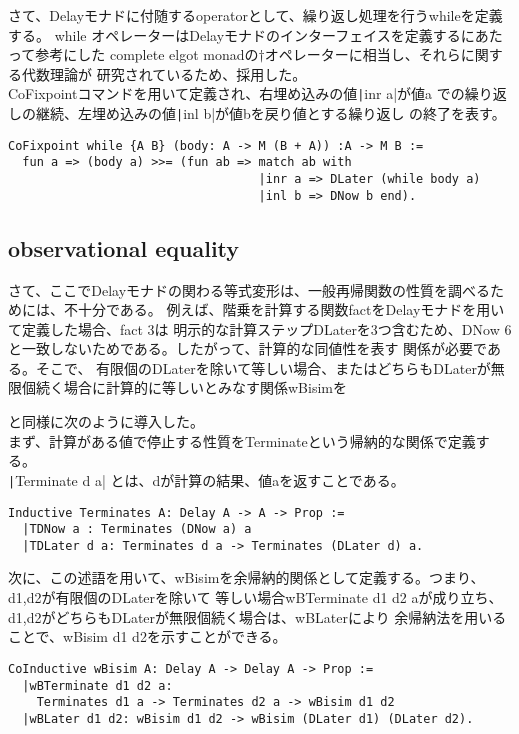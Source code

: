 \documentclass[japanese]{jssst_ppl}
\theoremstyle{definition}
\begin{document}
さて、Delayモナドに付随するoperatorとして、繰り返し処理を行うwhileを定義する。
while オペレーターはDelayモナドのインターフェイスを定義するにあたって参考にした
complete elgot monadの$\dagger$オペレーターに相当し、それらに関する代数理論が
研究されているため、採用した。\\
CoFixpointコマンドを用いて定義され、右埋め込みの値\texttt|inr a|が値a
での繰り返しの継続、左埋め込みの値\texttt|inl b|が値bを戻り値とする繰り返し
の終了を表す。

\begin{verbatim}
CoFixpoint while {A B} (body: A -> M (B + A)) :A -> M B :=
  fun a => (body a) >>= (fun ab => match ab with
                                   |inr a => DLater (while body a)
                                   |inl b => DNow b end).
\end{verbatim}




\subsection{observational equality}
さて、ここでDelayモナドの関わる等式変形は、一般再帰関数の性質を調べるためには、不十分である。
例えば、階乗を計算する関数factをDelayモナドを用いて定義した場合、fact 3は
明示的な計算ステップDLaterを3つ含むため、DNow 6と一致しないためである。したがって、計算的な同値性を表す
関係が必要である。そこで、
有限個のDLaterを除いて等しい場合、またはどちらもDLaterが無限個続く場合に計算的に等しいとみなす関係wBisimを


\cite{lmcs:2265}と同様に次のように導入した。\\


まず、計算がある値で停止する性質をTerminateという帰納的な関係で定義する。\\
\texttt|Terminate d a| とは、dが計算の結果、値aを返すことである。
\begin{verbatim}
Inductive Terminates A: Delay A -> A -> Prop :=
  |TDNow a : Terminates (DNow a) a
  |TDLater d a: Terminates d a -> Terminates (DLater d) a.
\end{verbatim}
次に、この述語を用いて、wBisimを余帰納的関係として定義する。つまり、d1,d2が有限個のDLaterを除いて
等しい場合wBTerminate d1 d2 aが成り立ち、d1,d2がどちらもDLaterが無限個続く場合は、wBLaterにより
余帰納法を用いることで、wBisim d1 d2を示すことができる。
\begin{verbatim}
CoInductive wBisim A: Delay A -> Delay A -> Prop :=
  |wBTerminate d1 d2 a:
    Terminates d1 a -> Terminates d2 a -> wBisim d1 d2
  |wBLater d1 d2: wBisim d1 d2 -> wBisim (DLater d1) (DLater d2).
\end{verbatim}
\end{document}
